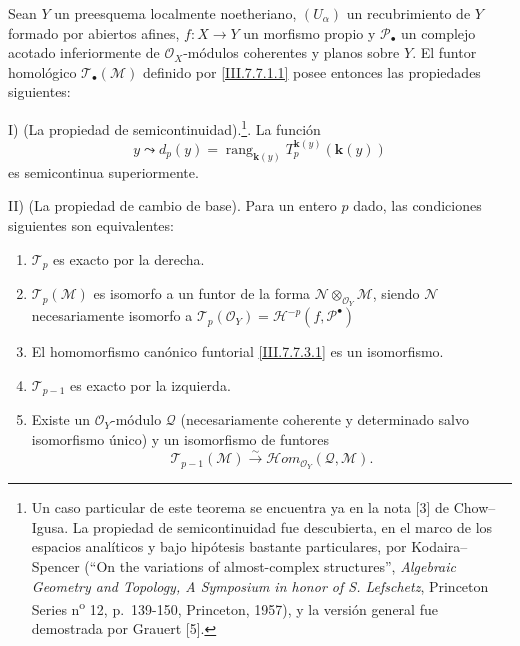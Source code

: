 \begin{theorem}[7.7.5]
\label{III.7.7.5}
Sean $Y$ un preesquema localmente noetheriano, $(U_\alpha)$ un recubrimiento
de $Y$ formado por abiertos afines, $f:X\to Y$ un morfismo propio y
$\mathscr P_\bullet$ un complejo acotado inferiormente de
$\mathscr O_X$-módulos coherentes y planos sobre $Y$. El funtor homológico
$\mathscr T_\bullet(\mathscr M)$ definido por \eqref{III.7.7.1.1} posee
entonces las propiedades siguientes:

\medskip
\noindent
\textnormal{I) (La propiedad de semicontinuidad).}\footnote{Un caso particular
de este teorema se encuentra ya en la nota [3] de Chow--Igusa. La propiedad de
semicontinuidad fue descubierta, en el marco de los espacios analíticos y bajo
hipótesis bastante particulares, por Kodaira--Spencer (``On the variations of
almost-complex structures'', \emph{Algebraic Geometry and Topology, A Symposium
in honor of S. Lefschetz}, Princeton Series n\textsuperscript{o} 12,
p.~139-150, Princeton, 1957), y la versión general fue demostrada por Grauert
[5].}.
La función
\[
  y\leadsto
  d_p(y)
  =
  \operatorname{rang}_{\mathbf{k}(y)}
    T_p^{\mathbf{k}(y)}(\boldsymbol{k}(y))
  \tag{7.7.5.1}\label{III.7.7.5.1.fr}
\]
es semicontinua superiormente.

\medskip
\noindent
\textnormal{II) (La propiedad de cambio de base).}
Para un entero $p$ dado, las condiciones siguientes son equivalentes:
\begin{enumerate}
  \item[\textup{a)}] $\mathscr T_p$ es exacto por la derecha.

  \item[\textup{a$'$)}] $\mathscr T_p(\mathscr M)$ es isomorfo a un funtor de la forma
    $\mathscr N\otimes_{\mathscr O_Y}\mathscr M$, siendo $\mathscr N$
    necesariamente isomorfo a
    $\mathscr T_p(\mathscr O_Y)=\mathscr H^{-p}(f,\mathscr P^\bullet)$

  \item[\textup{a$''$)}] El homomorfismo canónico funtorial
    \eqref{III.7.7.3.1} es un isomorfismo.

  \item[\textup{b)}] $\mathscr T_{p-1}$ es exacto por la izquierda.

  \item[\textup{b$'$)}] Existe un $\mathscr O_Y$-módulo $\mathscr Q$ (necesariamente
    coherente y determinado salvo isomorfismo único) y un isomorfismo de
    funtores
    \[
      \mathscr T_{p-1}(\mathscr M)
      \xrightarrow{\sim}
      \mathscr{H}\!om_{\mathscr O_Y}(\mathscr Q,\mathscr M).
      \tag{7.7.5.2}\label{III.7.7.5.2.fr}
    \]


\end{enumerate}
\end{theorem}
